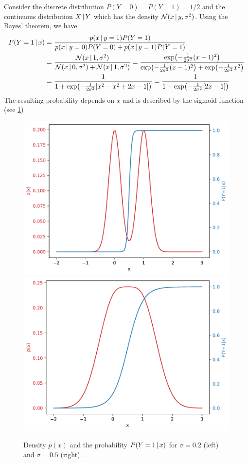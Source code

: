 \begin{example}
    Consider the discrete distribution $P(Y = 0) = P(Y = 1) = 1/2$ and the continuous distribution $X\,|\, Y$ which has the density $\mathcal{N}(x\,|\, y, \sigma^2)$.
    Using the Bayes' theorem, we have
    \begin{align}
        P(Y = 1 \cond x) =~& \frac{p(x\cond y= 1)P(Y=1)}{p(x\cond y= 0)P(Y=0) + p(x\cond y= 1)P(Y=1)}\\
        =~& \frac{\Normal(x\cond 1,\sigma^2)}{\Normal(x\cond 0,\sigma^2) + \Normal(x\cond 1,\sigma^2)} = \frac{\exp\left(-\frac{1}{2\sigma^2}(x-1)^2\right)}{\exp\left(-\frac{1}{2\sigma^2}(x-1)^2\right) + \exp\left(-\frac{1}{2\sigma^2}x^2\right)} \\
        =~& \frac{1}{1 + \exp\left(-\frac{1}{2\sigma^2}\left[x^2 - x^2 +2x - 1\right]\right)} = \frac{1}{1 + \exp\left(-\frac{1}{2\sigma^2}\left[2x - 1\right]\right)}
    \end{align}
    The resulting probability depends on $x$ and is described by the sigmoid function (see \cref{fig:sigmoids})
\end{example}

\begin{figure}[t]
    \centering
    \includegraphics[width=0.45\linewidth]{pics/sigmoid_sharp.pdf}
    \includegraphics[width=0.45\linewidth]{pics/sigmoid_mix.pdf}
    \caption{Density $p(x)$ and the probability $P(Y=1\,|\, x)$ for $\sigma=0.2$ (left) and $\sigma=0.5$ (right).}
    \label{fig:sigmoids}
\end{figure}

